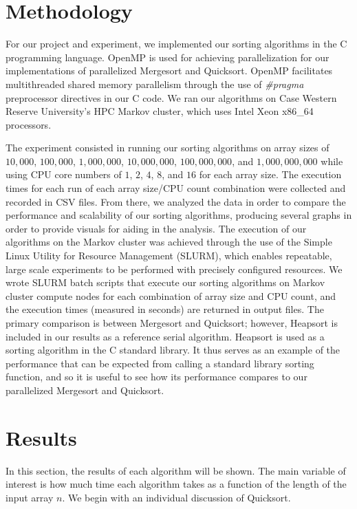 \documentclass[conference]{IEEEtran}
\begin{document}
    \section{Methodology}
    For our project and experiment, we implemented our sorting algorithms in the C programming language. OpenMP \cite{openmp08} is used for achieving parallelization for our implementations of parallelized Mergesort and Quicksort.
    OpenMP facilitates multithreaded shared memory parallelism through the use of \textit{\#pragma} preprocessor directives in our C code.
	We ran our algorithms on Case Western Reserve University's HPC Markov cluster, which uses Intel Xeon x86\_64 processors. 

	The experiment consisted in running our sorting algorithms on array sizes of $10,000$, $100,000$, $1,000,000$, $10,000,000$, $100,000,000$, and $1,000,000,000$ while using CPU core numbers of $1$, $2$, $4$, $8$, and $16$ for each array size. The execution times for each run of each array size/CPU count
	combination were collected and recorded in CSV files. From there, we analyzed the data in order to compare the performance and scalability of our sorting algorithms, producing several graphs in order to provide visuals for aiding in the analysis. The execution of our algorithms on the Markov cluster was achieved through the use of the Simple Linux Utility for Resource Management \cite{yoo_slurm_2003} (SLURM), which enables repeatable, large scale experiments to be performed with precisely configured resources. We wrote SLURM batch scripts that execute our sorting algorithms on Markov cluster compute nodes for each combination of array size and CPU count, and the execution times (measured in seconds) are returned in output files. The primary comparison is between Mergesort and Quicksort; however, Heapsort is included in our results as a reference serial algorithm. Heapsort is used as a sorting algorithm in the C standard library. It thus serves as an example of the performance that can be expected from calling a standard library sorting function, and so it is useful to see how its performance compares to our parallelized Mergesort and Quicksort.
    
    
    \section{Results}
    In this section, the results of each algorithm will be shown. 
    The main variable of interest is how much time each algorithm takes as a function of the length of the input array $n$.
    We begin with an individual discussion of Quicksort. 
    
\end{document}
